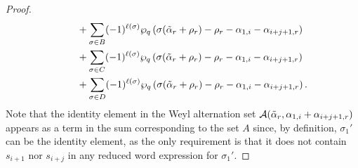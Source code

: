 \documentclass[10pt]{article}
\newcommand{\hr}[0]{\Tilde{\alpha}}
\newcommand{\qpartition}[1]{\wp_q\left(#1\right)}
\begin{document}
\begin{proof}
\begin{align}
    &\qquad + \sum_{\sigma\in B} (-1)^{\ell(\sigma)}\qpartition{\sigma(\hr_r+\rho_r)-\rho_r-\alpha_{1,i}-\alpha_{i+j+1,r}} \notag \\
    &\qquad +\sum_{\sigma\in C}  (-1)^{\ell(\sigma)}\qpartition{\sigma(\hr_r+\rho_r)-\rho_r-\alpha_{1,i}-\alpha_{i+j+1,r}} \notag \\
    &\qquad + \sum_{\sigma\in D} (-1)^{\ell(\sigma)}\qpartition{\sigma(\hr_r+\rho_r)-\rho_r-\alpha_{1,i}-\alpha_{i+j+1,r}}.
        \label{eq: difference of q broken down}
    \end{align}
    Note that the identity element in the Weyl alternation set $\mathcal{A}(\hr_r,\alpha_{1,i}+\alpha_{i+j+1,r})$ appears as a term in the sum corresponding to the set $A$
    since, by definition, $\sigma_1'$ can be the identity element, as the only requirement is that it does not contain $s_{i+1}$ nor $s_{i+j}$ in any reduced word expression for $\sigma_1'$. 


\end{proof}
\end{document}
